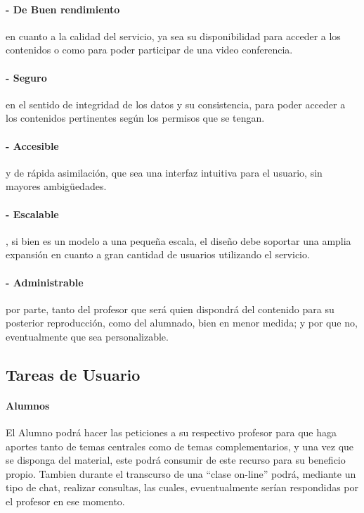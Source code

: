 \documentclass[12pt]{article}
\begin{document}
\paragraph{- De Buen rendimiento} en cuanto a la calidad del servicio, ya sea su disponibilidad para acceder a los 
contenidos o como para poder participar de una video conferencia.\\

\paragraph{- Seguro} en el sentido de integridad de los datos y su consistencia, para poder acceder a los contenidos
pertinentes según los permisos que se tengan.\\

\paragraph{- Accesible} y de rápida asimilación, que sea una interfaz intuitiva para el usuario, sin mayores
ambigüedades.\\

\paragraph{- Escalable}, si bien es un modelo a una peque\~na escala, el dise\~no debe soportar una amplia 
expansión en cuanto a gran cantidad de usuarios utilizando el servicio.\\

\paragraph{- Administrable} por parte, tanto del profesor que será quien dispondrá del contenido para su posterior
reproducción, como del alumnado, bien en menor medida; y por que no, eventualmente que sea personalizable.\\

\newpage
\subsection{Tareas de Usuario}
\paragraph{Alumnos\\}

El Alumno podrá hacer las peticiones a su respectivo profesor para que haga aportes tanto de temas 
centrales como de temas complementarios, y una vez que se disponga del material, este podrá consumir
de este recurso para su beneficio propio. Tambien durante el transcurso de una ``clase on-line'' podrá,
mediante un tipo de chat, realizar consultas, las cuales, evuentualmente serían respondidas por el profesor en ese momento.\\
\end{document}
